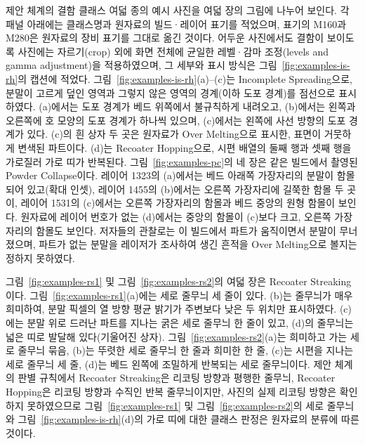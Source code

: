 제안 체계의 결함 클래스 여덟 종의 예시 사진을 여덟 장의 그림에 나누어
보인다. 각 패널 아래에는 클래스명과 원자료의 빌드·레이어 표기를
적었으며, 표기의 M160과 M280은 원자료의 장비 표기를 그대로 옮긴
것이다. 어두운 사진에서도 결함이 보이도록 사진에는 자르기(crop) 외에
화면 전체에 균일한 레벨·감마 조정(levels and gamma adjustment)을
적용하였으며, 그 세부와 표시 방식은 그림~\ref{fig:examples-is-rh}의
캡션에 적었다. 그림~\ref{fig:examples-is-rh}(a)--(c)는 Incomplete
Spreading으로, 분말이 고르게 덮인 영역과 그렇지 않은 영역의 경계(이하
도포 경계)를 점선으로 표시하였다. (a)에서는 도포 경계가 베드 위쪽에서
불규칙하게 내려오고, (b)에서는 왼쪽과 오른쪽에 호 모양의 도포 경계가
하나씩 있으며, (c)에서는 왼쪽에 사선 방향의 도포 경계가 있다. (c)의 흰
상자 두 곳은 원자료가 Over Melting으로 표시한, 표면이 거뭇하게 변색된
파트이다. (d)는 Recoater Hopping으로, 시편 배열의 둘째 행과 셋째 행을
가로질러 가로 띠가 반복된다. 그림~\ref{fig:examples-pc}의 네 장은 같은
빌드에서 촬영된 Powder Collapse이다. 레이어 1323의 (a)에서는 베드
아래쪽 가장자리의 분말이 함몰되어 있고(확대 인셋), 레이어 1455의
(b)에서는 오른쪽 가장자리에 길쭉한 함몰 두 곳이, 레이어 1531의
(c)에서는 오른쪽 가장자리의 함몰과 베드 중앙의 원형 함몰이 보인다.
원자료에 레이어 번호가 없는 (d)에서는 중앙의 함몰이 (c)보다 크고,
오른쪽 가장자리의 함몰도 보인다. 저자들의 관찰로는 이 빌드에서 파트가
움직이면서 분말이 무너졌으며, 파트가 없는 분말을 레이저가 조사하여 생긴
흔적을 Over Melting으로 볼지는 정하지 못하였다. 

그림~\ref{fig:examples-rs1} 및
그림~\ref{fig:examples-rs2}의 여덟 장은 Recoater Streaking이다.
그림~\ref{fig:examples-rs1}(a)에는 세로 줄무늬 세 줄이 있다. (b)는
줄무늬가 매우 희미하여, 분말 픽셀의 열 방향 평균 밝기가 주변보다 낮은
두 위치만 표시하였다. (c)에는 분말 위로 드러난 파트를 지나는 굵은 세로
줄무늬 한 줄이 있고, (d)의 줄무늬는 넓은 띠로 발달해 있다(기울어진
상자). 그림~\ref{fig:examples-rs2}(a)는 희미하고 가는 세로 줄무늬
묶음, (b)는 뚜렷한 세로 줄무늬 한 줄과 희미한 한 줄, (c)는 시편을
지나는 세로 줄무늬 세 줄, (d)는 베드 왼쪽에 조밀하게 반복되는 세로
줄무늬이다. 제안 체계의 판별 규칙에서 Recoater Streaking은 리코팅
방향과 평행한 줄무늬, Recoater Hopping은 리코팅 방향과 수직인 반복
줄무늬이지만, 사진의 실제 리코팅 방향은 확인하지 못하였으므로
그림~\ref{fig:examples-rs1} 및 그림~\ref{fig:examples-rs2}의 세로
줄무늬와 그림~\ref{fig:examples-is-rh}(d)의 가로 띠에 대한 클래스
판정은 원자료의 분류에 따른 것이다.

